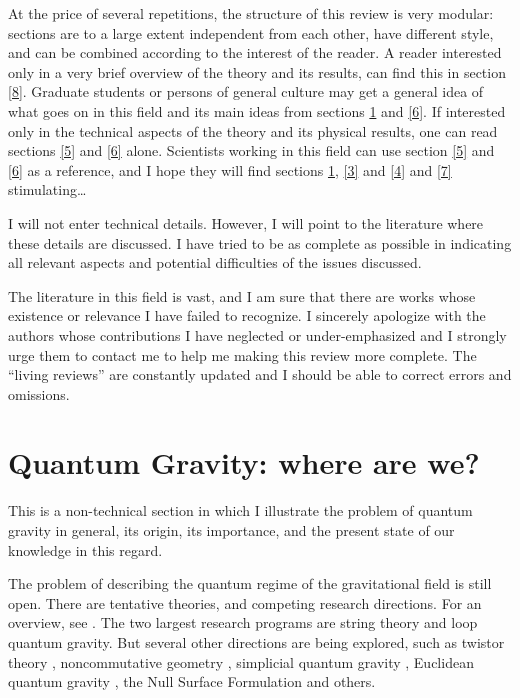 \documentclass[12pt]{article}
\begin{document}
At the price of several repetitions, the structure of this review is very 
modular: sections are to a large extent independent from each other, 
have different style, and can be combined according to the interest of 
the reader.  A reader interested only in a very brief overview of the 
theory and its results, can find this in section \ref{8}.  Graduate 
students or persons of general culture may get a general idea of what 
goes on in this field and its main ideas from sections \ref{2} and 
\ref{6}.  If interested only in the technical aspects of the theory 
and its physical results, one can read sections \ref{5} and \ref{6} 
alone.  Scientists working in this field can use section \ref{5} and 
\ref{6} as a reference, and I hope they will find sections \ref{2}, 
\ref{3} and \ref{4} and \ref{7} stimulating\ldots

I will not enter technical details.  However, I will point to the 
literature where these details are discussed.  I have tried to be as 
complete as possible in indicating all relevant aspects and potential 
difficulties of the issues discussed.

The literature in this field is vast, and I am sure that there are 
works whose existence or relevance I have failed to recognize.  I 
sincerely apologize with the authors whose contributions I have 
neglected or under-emphasized and I strongly urge them to contact me 
to help me making this review more complete.  The ``living reviews'' 
are constantly updated and I should be able to correct errors and 
omissions.

\section{Quantum Gravity: where are we?}\label{2}

This is a non-technical section in which I illustrate the problem 
of quantum gravity in general, its origin, its importance, and 
the present state of our knowledge in this regard.

The problem of describing the quantum regime of the gravitational 
field is still open.  There are tentative theories, and competing 
research directions.  For an overview, see \cite{Isham95}.  The 
two largest research programs are string theory and loop quantum 
gravity.  But several other directions are being explored, such 
as twistor theory \cite{Twistors}, noncommutative geometry 
\cite{Noncommutative}, simplicial quantum gravity 
\cite{Simplicial,Simplicial2,Simplicial3,Simplicial4}, Euclidean 
quantum gravity \cite{Euclidean,Euclidean2}, the Null Surface 
Formulation \cite{Newman,Newman2,Newman3} and others.
\end{document}

